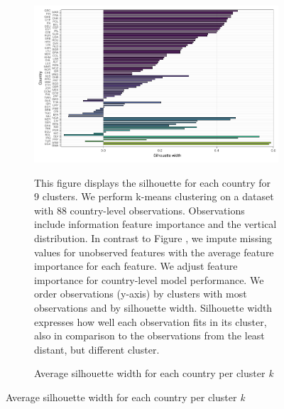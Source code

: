  \begin{figure}[ht!]\ContinuedFloat
   \centering
   \begin{subfigure}[b]{\textwidth}
   \centering
   \includegraphics{Figures_Appendix/Figure_Silhouette_Clusters_3.pdf}
   \caption{Average silhouette width for each country per cluster \textit{k}} \label{fig:G2_silhouette_3}
   \begin{subcaption2}
     This figure displays the silhouette for each country for 9 clusters. We perform k-means clustering on a dataset with 88 country-level observations. Observations include information feature importance and the vertical distribution. In contrast to Figure , we impute missing values for unobserved features with the average feature importance for each feature. We adjust feature importance for country-level model performance.  We order observations (y-axis) by clusters with most observations and by silhouette width. Silhouette width expresses how well each observation fits in its cluster, also in comparison to the observations from the least distant, but different cluster.
   \end{subcaption2}
   \end{subfigure}
 \end{figure}
 \clearpage